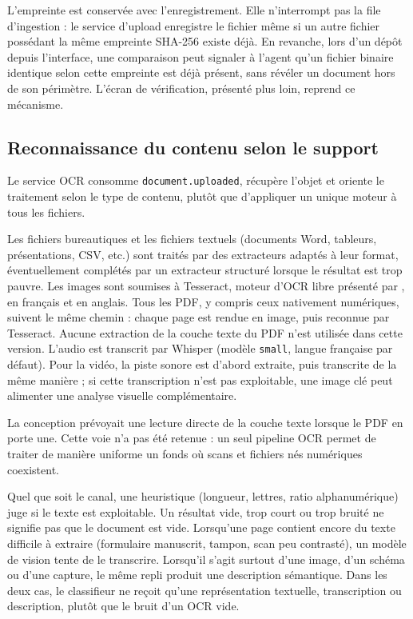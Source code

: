 L'empreinte est conservée avec l'enregistrement. Elle n'interrompt pas la file d'ingestion : le service d'upload enregistre le fichier même si un autre fichier possédant la même empreinte SHA-256 existe déjà. En revanche, lors d'un dépôt depuis l'interface, une comparaison peut signaler à l'agent qu'un fichier binaire identique selon cette empreinte est déjà présent, sans révéler un document hors de son périmètre. L'écran de vérification, présenté plus loin, reprend ce mécanisme.

\subsection{Reconnaissance du contenu selon le support}

Le service OCR consomme \texttt{document.uploaded}, récupère l'objet et oriente le traitement selon le type de contenu, plutôt que d'appliquer un unique moteur à tous les fichiers.

Les fichiers bureautiques et les fichiers textuels (documents Word, tableurs, présentations, CSV, etc.) sont traités par des extracteurs adaptés à leur format, éventuellement complétés par un extracteur structuré lorsque le résultat est trop pauvre. Les images sont soumises à Tesseract, moteur d'OCR libre présenté par , en français et en anglais. Tous les PDF, y compris ceux nativement numériques, suivent le même chemin : chaque page est rendue en image, puis reconnue par Tesseract. Aucune extraction de la couche texte du PDF n'est utilisée dans cette version. L'audio est transcrit par Whisper (modèle \texttt{small}, langue française par défaut). Pour la vidéo, la piste sonore est d'abord extraite, puis transcrite de la même manière ; si cette transcription n'est pas exploitable, une image clé peut alimenter une analyse visuelle complémentaire.

La conception prévoyait une lecture directe de la couche texte lorsque le PDF en porte une. Cette voie n'a pas été retenue : un seul pipeline OCR permet de traiter de manière uniforme un fonds où scans et fichiers nés numériques coexistent.

Quel que soit le canal, une heuristique (longueur, lettres, ratio alphanumérique) juge si le texte est exploitable. Un résultat vide, trop court ou trop bruité ne signifie pas que le document est vide. Lorsqu'une page contient encore du texte difficile à extraire (formulaire manuscrit, tampon, scan peu contrasté), un modèle de vision tente de le transcrire. Lorsqu'il s'agit surtout d'une image, d'un schéma ou d'une capture, le même repli produit une description sémantique. Dans les deux cas, le classifieur ne reçoit qu'une représentation textuelle, transcription ou description, plutôt que le bruit d'un OCR vide.

